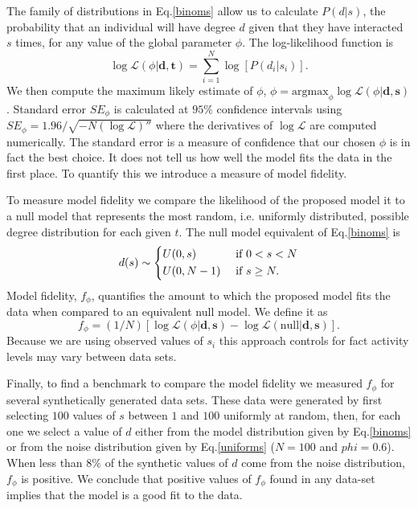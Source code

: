 \documentclass[10pt]{article}
\begin{document}
\begin{multicols}{2}
The family of distributions in Eq.\eqref{binoms} allow us to calculate $P(d|s)$, the probability that an individual will have degree $d$ given that they have interacted $s$ times, for any value of the global parameter $\phi$. The log-likelihood function is
\begin{equation}
\log \mathcal{L}(\phi|\textbf{d},\textbf{t})=\sum_{i=1}^{N}\log[P(d_{i}|s_{i})].
\end{equation}
We then compute the maximum likely estimate of $\phi$, $\phi=\text{argmax}_{\phi}\log \mathcal{L}(\phi|\textbf{d},\textbf{s})$. Standard error $SE_{\phi}$ is calculated at $95\%$ confidence intervals using $SE_{\phi}=1.96/\sqrt{-N(\log \mathcal{L})''}$ where the derivatives of $\log \mathcal{L}$ are computed numerically. The standard error is a measure of confidence that our chosen $\phi$ is in fact the best choice. It does not tell us how well the model fits the data in the first place. To quantify this we introduce a measure of model fidelity.

To measure model fidelity we compare the likelihood of the proposed model it to a null model that represents the most random, i.e. uniformly distributed, possible degree distribution for each given $t$. The null model equivalent of Eq.\eqref{binoms} is
\begin{equation}
\label{uniforms}
d(s) \sim 
   \begin{dcases}
    U(0,s) & \text{ if }0<s<N\\
    U(0,N-1) & \text{ if } s \geq N.
  \end{dcases}
\end{equation}
Model fidelity, $f_{\phi}$, quantifies the amount to which the proposed model fits the data when compared to an equivalent null model. We define it as
\begin{equation}
\label{fidelity}
f_{\phi}=(1/N)[\log \mathcal{L}(\phi|\textbf{d},\textbf{s})-\log \mathcal{L}(\text{null}|\textbf{d},\textbf{s})].
\end{equation}
Because we are using observed values of $s_{i}$ this approach controls for fact activity levels may vary between data sets.

Finally, to find a benchmark to compare the model fidelity we measured $f_{\phi}$ for several synthetically generated data sets. These data were generated by first selecting $100$ values of $s$ between $1$ and $100$ uniformly at random, then, for each one we select a value of $d$ either from the model distribution given by Eq.\eqref{binoms} or from the noise distribution given by Eq.\eqref{uniforms} ($N=100$ and $phi=0.6$). When less than $8\%$ of the synthetic values of $d$ come from the noise distribution, $f_{\phi}$ is positive. We conclude that positive values of $f_{\phi}$ found in any data-set implies that the model is a good fit to the data. 


\end{multicols}
\end{document}
